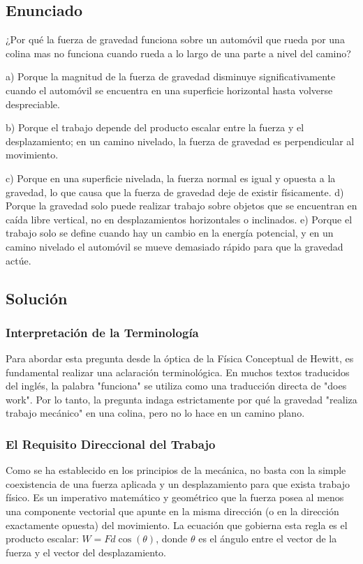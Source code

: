 \documentclass[a4paper,12pt]{article}
\begin{document}
\newpage

\subsection*{Enunciado}
¿Por qué la fuerza de gravedad funciona sobre un automóvil que rueda por una colina mas no funciona cuando rueda a lo largo de una parte a nivel del camino?

a) Porque la magnitud de la fuerza de gravedad disminuye significativamente cuando el automóvil se encuentra en una superficie horizontal hasta volverse despreciable.

b) Porque el trabajo depende del producto escalar entre la fuerza y el desplazamiento; en un camino nivelado, la fuerza de gravedad es perpendicular al movimiento.

c) Porque en una superficie nivelada, la fuerza normal es igual y opuesta a la gravedad, lo que causa que la fuerza de gravedad deje de existir físicamente.
d) Porque la gravedad solo puede realizar trabajo sobre objetos que se encuentran en caída libre vertical, no en desplazamientos horizontales o inclinados.
e) Porque el trabajo solo se define cuando hay un cambio en la energía potencial, y en un camino nivelado el automóvil se mueve demasiado rápido para que la gravedad actúe.

\subsection*{Solución}

\subsubsection*{Interpretación de la Terminología}
Para abordar esta pregunta desde la óptica de la Física Conceptual de Hewitt, es fundamental realizar una aclaración terminológica. En muchos textos traducidos del inglés, la palabra "funciona" se utiliza como una traducción directa de "does work". Por lo tanto, la pregunta indaga estrictamente por qué la gravedad "realiza trabajo mecánico" en una colina, pero no lo hace en un camino plano.

\subsubsection*{El Requisito Direccional del Trabajo}
Como se ha establecido en los principios de la mecánica, no basta con la simple coexistencia de una fuerza aplicada y un desplazamiento para que exista trabajo físico. Es un imperativo matemático y geométrico que la fuerza posea al menos una componente vectorial que apunte en la misma dirección (o en la dirección exactamente opuesta) del movimiento. La ecuación que gobierna esta regla es el producto escalar: $W = F d \cos(\theta)$, donde $\theta$ es el ángulo entre el vector de la fuerza y el vector del desplazamiento.
\end{document}
